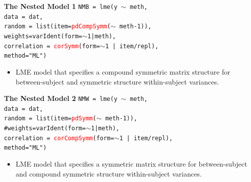 \documentclass[compress]{beamer}        %
\makeatletter
\newcommand{\tcb}{\textcolor{beamer@blendedblue}}
\newcommand{\tcr}{\textcolor{red}}
\makeatother
\begin{document}
\begin{frame}[fragile]{\bf \tcb{The Nested Model 1}}
\texttt{NMB = lme(y $\sim$ meth,\\
   \hspace{0.6cm} data = dat,\\
   \hspace{0.6cm} random = list(item=\tcr{pdCompSymm}($\sim$ meth-1)), \\
   \hspace{0.6cm} weights=varIdent(form=$\sim$1|meth),\\
   \hspace{0.6cm} correlation = \tcr{corSymm}(form=$\sim$1 | item/repl),\\
   \hspace{0.6cm} method="ML")}

\begin{itemize}
\item LME model that specifies a compound symmetric matrix structure for between-subject and symmetric structure within-subject variances.
\end{itemize}

\end{frame}
\begin{frame}[fragile]{\bf \tcb{The Nested Model 2}}
\texttt{NMW = lme(y $\sim$ meth,\\
   \hspace{0.6cm} data = dat,\\
   \hspace{0.6cm} random = list(item=\tcr{pdSymm}($\sim$ meth-1)), \\
   \hspace{0.6cm} \tcb{\#weights=varIdent(form=$\sim$1|meth),}\\
   \hspace{0.6cm} correlation = \tcr{corCompSymm}(form=$\sim$1 | item/repl),\\
   \hspace{0.6cm} method="ML")}
   \begin{itemize}
\item LME model that specifies a symmetric matrix structure for between-subject and compound symmetric structure within-subject variances.
\end{itemize}
\end{frame}
\end{document}
